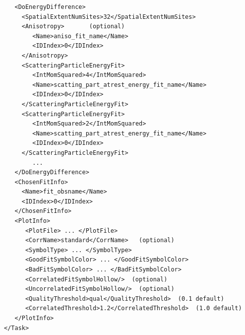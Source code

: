 \documentclass[12pt]{article}
\begin{document}
\begin{verbatim}
   <DoEnergyDifference>                                                  
     <SpatialExtentNumSites>32</SpatialExtentNumSites>                   
     <Anisotropy>       (optional)                                       
        <Name>aniso_fit_name</Name>                                      
        <IDIndex>0</IDIndex>                                             
     </Anisotropy>                                                       
     <ScatteringParticleEnergyFit>                                       
        <IntMomSquared>4</IntMomSquared>                                 
        <Name>scatting_part_atrest_energy_fit_name</Name>                
        <IDIndex>0</IDIndex>                                             
     </ScatteringParticleEnergyFit>                                      
     <ScatteringParticleEnergyFit>                                       
        <IntMomSquared>2</IntMomSquared>                                 
        <Name>scatting_part_atrest_energy_fit_name</Name>                
        <IDIndex>0</IDIndex>                                             
     </ScatteringParticleEnergyFit>                                      
        ...                                                              
   </DoEnergyDifference>                                                 
   <ChosenFitInfo>                                                       
     <Name>fit_obsname</Name>                                            
     <IDIndex>0</IDIndex>                                                
   </ChosenFitInfo>                                                      
   <PlotInfo>                                                            
      <PlotFile> ... </PlotFile>                                         
      <CorrName>standard</CorrName>   (optional)                         
      <SymbolType> ... </SymbolType>                                     
      <GoodFitSymbolColor> ... </GoodFitSymbolColor>                     
      <BadFitSymbolColor> ... </BadFitSymbolColor>                       
      <CorrelatedFitSymbolHollow/>  (optional)                           
      <UncorrelatedFitSymbolHollow/>  (optional)                         
      <QualityThreshold>qual</QualityThreshold>  (0.1 default)           
      <CorrelatedThreshold>1.2</CorrelatedThreshold>  (1.0 default)      
   </PlotInfo>                                                           
</Task>                                                                  
\end{verbatim}
\end{document}
